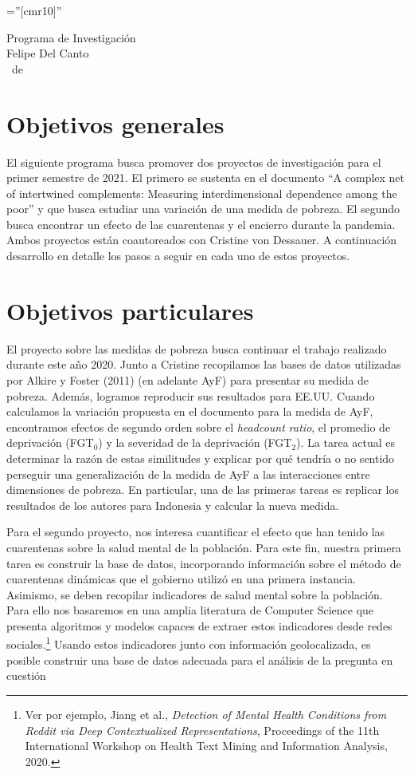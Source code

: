 \documentclass[a4paper, margins=2cm,11pt]{article}
\begin{document}
\pagestyle{empty} %

\font\fb=''[cmr10]'' %

\par{\centering
		{{\Huge Programa de Investigación} \\[1ex]
		 {\Large Felipe Del Canto}	\\[1.5ex]
		 {\Large \monthname\ de \the\year }
	}\par}

\section{Objetivos generales}
El siguiente programa busca promover dos proyectos de investigación para el primer semestre de 2021. El primero se sustenta en el documento “A complex net of intertwined complements: Measuring interdimensional dependence among the poor” y que busca estudiar una variación de una medida de pobreza. El segundo busca encontrar un efecto de las cuarentenas y el encierro durante la pandemia. Ambos proyectos están coautoreados con Cristine von Dessauer. A continuación desarrollo en detalle los pasos a seguir en cada uno de estos proyectos.

\section{Objetivos particulares}
El proyecto sobre las medidas de pobreza busca continuar el trabajo realizado durante este año 2020. Junto a Cristine recopilamos las bases de datos utilizadas por Alkire y Foster (2011) (en adelante AyF) para presentar su medida de pobreza. Además, logramos reproducir sus resultados para EE.UU. Cuando calculamos la variación propuesta en el documento para la medida de AyF, encontramos efectos de segundo orden sobre el \textit{headcount ratio}, el promedio de deprivación (FGT$_{0}$) y la severidad de la deprivación (FGT$_{2}$). La tarea actual es determinar la razón de estas similitudes y explicar por qué tendría o no sentido perseguir una generalización de la medida de AyF a las interacciones entre dimensiones de pobreza. En particular, una de las primeras tareas es replicar los resultados de los autores para Indonesia y calcular la nueva medida.

Para el segundo proyecto, nos interesa cuantificar el efecto que han tenido las cuarentenas sobre la salud mental de la población. Para este fin, nuestra primera tarea es construir la base de datos, incorporando información sobre el método de cuarentenas dinámicas que el gobierno utilizó en una primera instancia. Asimismo, se deben recopilar indicadores de salud mental sobre la población. Para ello nos basaremos en una amplia literatura de Computer Science que presenta algoritmos y modelos capaces de extraer estos indicadores desde redes sociales.\footnote{Ver por ejemplo, Jiang et al., \textit{Detection of Mental Health Conditions from Reddit via Deep Contextualized Representations}, Proceedings of the 11th International Workshop on Health Text Mining and Information Analysis, 2020.} Usando estos indicadores junto con información geolocalizada, es posible construir una base de datos adecuada para el análisis de la pregunta en cuestión
\end{document}
